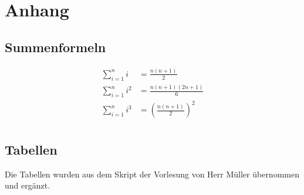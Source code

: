 \section{Anhang}
\subsection{Summenformeln}
\[ \begin{aligned}
  \sum_{i=1}^{n}i     & = \frac{n(n+1)}{2} \\
  \sum_{i=1}^{n}i^2   & = \frac{n(n+1)(2n+1)}{6} \\
  \sum_{i=1}^{n}i^3   & = \left(\frac{n(n+1)}{2}\right)^2 \\
\end{aligned} \]

\subsection{Tabellen}
Die Tabellen wurden aus dem Skript der Vorlesung von Herr Müller
übernommen und ergänzt.

